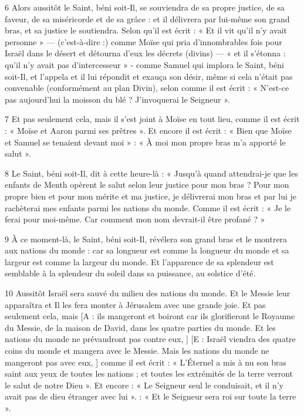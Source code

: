 \par 6 Alors aussitôt le Saint, béni soit-Il, se souviendra de sa propre justice, de sa faveur, de sa miséricorde et de sa grâce : et il délivrera par lui-même son grand bras, et sa justice le soutiendra. Selon qu'il est écrit : « Et il vit qu'il n'y avait personne » — (c'est-à-dire :) comme Moïse qui pria d'innombrables fois pour Israël dans le désert et détourna d'eux les décrets (divins) — « et il s'étonna : qu'il n'y avait pas d'intercesseur » - comme Samuel qui implora le Saint, béni soit-Il, et l'appela et il lui répondit et exauça son désir, même si cela n'était pas convenable (conformément au plan Divin), selon comme il est écrit : « N'est-ce pas aujourd'hui la moisson du blé ? J'invoquerai le Seigneur ».

\par 7 Et pas seulement cela, mais il s'est joint à Moïse en tout lieu, comme il est écrit : « Moïse et Aaron parmi ses prêtres ». Et encore il est écrit : « Bien que Moïse et Samuel se tenaient devant moi » : « À moi mon propre bras m’a apporté le salut ».

\par 8 Le Saint, béni soit-Il, dit à cette heure-là : « Jusqu'à quand attendrai-je que les enfants de Menth opèrent le salut selon leur justice pour mon bras ? Pour mon propre bien et pour mon mérite et ma justice, je délivrerai mon bras et par lui je rachèterai mes enfants parmi les nations du monde. Comme il est écrit : « Je le ferai pour moi-même. Car comment mon nom devrait-il être profané ? »

\par 9 À ce moment-là, le Saint, béni soit-Il, révélera son grand bras et le montrera aux nations du monde : car sa longueur est comme la longueur du monde et sa largeur est comme la largeur du monde. Et l’apparence de sa splendeur est semblable à la splendeur du soleil dans sa puissance, au solstice d’été.

\par 10 Aussitôt Israël sera sauvé du milieu des nations du monde. Et le Messie leur apparaîtra et Il les fera monter à Jérusalem avec une grande joie. Et pas seulement cela, mais [A : ils mangeront et boiront car ils glorifieront le Royaume du Messie, de la maison de David, dans les quatre parties du monde. Et les nations du monde ne prévaudront pas contre eux, ] [E : Israël viendra des quatre coins du monde et mangera avec le Messie. Mais les nations du monde ne mangeront pas avec eux, ] comme il est écrit : « L'Éternel a mis à nu son bras saint aux yeux de toutes les nations ; et toutes les extrémités de la terre verront le salut de notre Dieu ». Et encore : « Le Seigneur seul le conduisait, et il n'y avait pas de dieu étranger avec lui ». : « Et le Seigneur sera roi sur toute la terre ».



